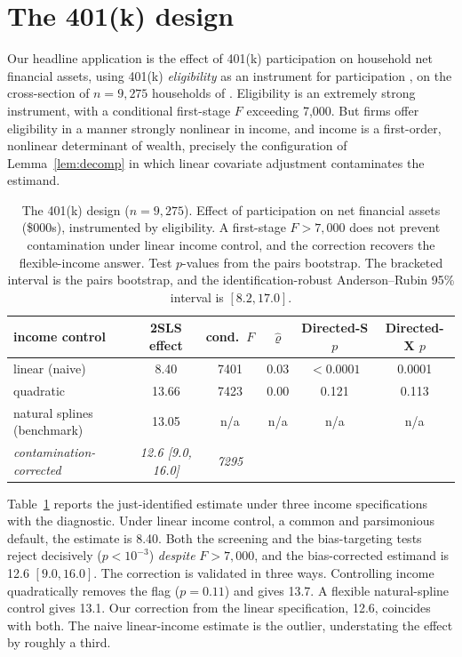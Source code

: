 \documentclass[11pt]{article}
\theoremstyle{plain}
\theoremstyle{definition}
\begin{document}
\section{The 401(k) design}\label{sec:401k}

Our headline application is the effect of 401(k) participation on household net financial assets, using 401(k) \emph{eligibility} as an instrument for participation \citep{poterba1995,abadie2003}, on the cross-section of $n=9{,}275$ households of \citet{wooldridge2010}. Eligibility is an extremely strong instrument, with a conditional first-stage $F$ exceeding 7{,}000. But firms offer eligibility in a manner strongly nonlinear in income, and income is a first-order, nonlinear determinant of wealth, precisely the configuration of Lemma~\ref{lem:decomp} in which linear covariate adjustment contaminates the estimand.

\begin{table}[t]
\centering
\caption{The 401(k) design ($n=9{,}275$). Effect of participation on net financial assets (\$000s), instrumented by eligibility. A first-stage $F>7{,}000$ does not prevent contamination under linear income control, and the correction recovers the flexible-income answer. Test $p$-values from the pairs bootstrap. The bracketed interval is the pairs bootstrap, and the identification-robust Anderson--Rubin 95\% interval is $[8.2,17.0]$.}
\label{tab:401k}
\begin{tabular}{lccccc}
\toprule
income control & 2SLS effect & cond.\ $F$ & $\hat\varrho$ & Directed-S $p$ & Directed-X $p$\\
\midrule
linear (naive) & 8.40 & 7401 & 0.03 & $<0.0001$ & 0.0001\\
quadratic & 13.66 & 7423 & 0.00 & 0.121 & 0.113\\
natural splines (benchmark) & 13.05 & n/a & n/a & n/a & n/a\\
\textit{contamination-corrected} & \textit{12.6 [9.0, 16.0]} & \textit{7295} & & &\\
\bottomrule
\end{tabular}
\end{table}

Table~\ref{tab:401k} reports the just-identified estimate under three income specifications with the diagnostic. Under linear income control, a common and parsimonious default, the estimate is 8.40. Both the screening and the bias-targeting tests reject decisively ($p<10^{-3}$) \emph{despite} $F>7{,}000$, and the bias-corrected estimand is 12.6 $[9.0,16.0]$. The correction is validated in three ways. Controlling income quadratically removes the flag ($p=0.11$) and gives 13.7. A flexible natural-spline control gives 13.1. Our correction from the linear specification, 12.6, coincides with both. The naive linear-income estimate is the outlier, understating the effect by roughly a third.
\end{document}
